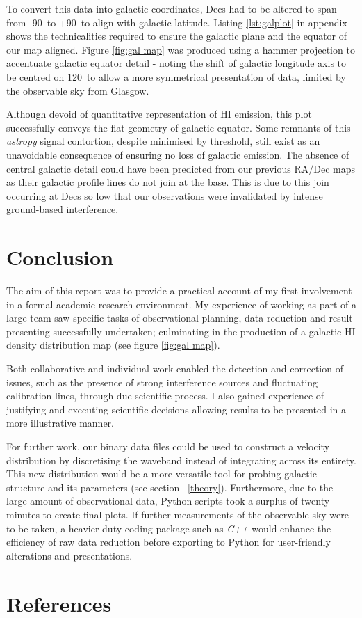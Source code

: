 \documentclass[a4paper]{jpconf}
\begin{document}
\begin{multicols}{2}
To convert this data into galactic coordinates, Decs had to be altered to span from -90\degree~to +90\degree~to align with galactic latitude. Listing \ref{lst:galplot} in appendix shows the technicalities required to ensure the galactic plane and the equator of our map aligned. Figure \ref{fig:gal map} was produced using a hammer projection to accentuate galactic equator detail - noting the shift of galactic longitude axis to be centred on 120\degree~to allow a more symmetrical presentation of data, limited by the observable sky from Glasgow.



Although devoid of quantitative representation of HI emission, this plot successfully conveys the flat geometry of galactic equator. Some remnants of this \textit{astropy} signal contortion, despite minimised by threshold, still exist as an unavoidable consequence of ensuring no loss of galactic emission. The absence of central galactic detail could have been predicted from our previous RA/Dec maps as their galactic profile lines do not join at the base. This is due to this join occurring at Decs so low that our observations were invalidated by intense ground-based interference.





\section{Conclusion} \label{conc}

The aim of this report was to provide a practical account of my first involvement in a formal academic research environment. My experience of working as part of a large team saw specific tasks of observational planning, data reduction and result presenting successfully undertaken; culminating in the production of a galactic HI density distribution map (see figure \ref{fig:gal map}).

Both collaborative and individual work enabled the detection and correction of issues, such as the presence of strong interference sources and fluctuating calibration lines, through due scientific process. I also gained experience of justifying and executing scientific decisions allowing results to be presented in a more illustrative manner.

For further work, our binary data files could be used to construct a velocity distribution by discretising the waveband instead of integrating across its entirety. This new distribution would be a more versatile tool for probing galactic structure and its parameters (see section ~\ref{theory}). Furthermore, due to the large amount of observational data, Python scripts took a surplus of twenty minutes to create final plots. If further measurements of the observable sky were to be taken, a heavier-duty coding package such as \textit{C++} would enhance the efficiency of raw data reduction before exporting to Python for user-friendly alterations and presentations.

\section*{References}
{}


\end{multicols}
\end{document}

